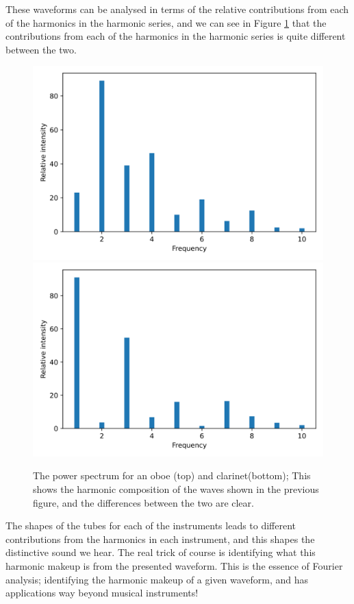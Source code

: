 \documentclass[
]{book}
\begin{document}
These waveforms can be analysed in terms of the relative contributions from each of the harmonics in the harmonic series, and we can see in Figure \ref{fig:ch11-oboeclarinetharmonics} that the contributions from each of the harmonics in the harmonic series is quite different between the two.

\begin{figure}

{\centering \includegraphics[width=0.7\linewidth]{visualisations/slides-powerspectrum_oboe} \includegraphics[width=0.7\linewidth]{visualisations/slides-powerspectrum_clar} 

}

\caption{The power spectrum for an oboe (top) and clarinet(bottom); This shows the harmonic composition of the waves shown in the previous figure, and the differences between the two are clear.}\label{fig:ch11-oboeclarinetharmonics}
\end{figure}

The shapes of the tubes for each of the instruments leads to different contributions from the harmonics in each instrument, and this shapes the distinctive sound we hear. The real trick of course is identifying what this harmonic makeup is from the presented waveform. This is the essence of Fourier analysis; identifying the harmonic makeup of a given waveform, and has applications way beyond musical instruments!
\end{document}
